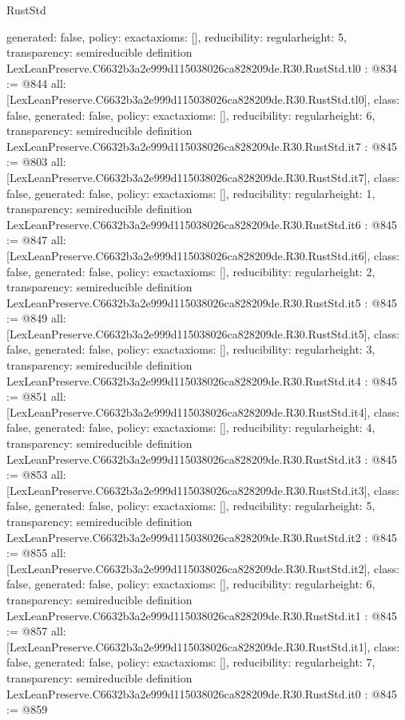 \begin{lexlean}{RustStd}
\begin{coremodule}
{  generated: false,
  policy: exact{axioms: []},
  reducibility: regular{height: 5},
  transparency: semireducible
}
definition LexLeanPreserve.C6632b3a2e999d115038026ca828209de.R30.RustStd.tl0 : @834 := @844 {
  all: [LexLeanPreserve.C6632b3a2e999d115038026ca828209de.R30.RustStd.tl0],
  class: false,
  generated: false,
  policy: exact{axioms: []},
  reducibility: regular{height: 6},
  transparency: semireducible
}
definition LexLeanPreserve.C6632b3a2e999d115038026ca828209de.R30.RustStd.it7 : @845 := @803 {
  all: [LexLeanPreserve.C6632b3a2e999d115038026ca828209de.R30.RustStd.it7],
  class: false,
  generated: false,
  policy: exact{axioms: []},
  reducibility: regular{height: 1},
  transparency: semireducible
}
definition LexLeanPreserve.C6632b3a2e999d115038026ca828209de.R30.RustStd.it6 : @845 := @847 {
  all: [LexLeanPreserve.C6632b3a2e999d115038026ca828209de.R30.RustStd.it6],
  class: false,
  generated: false,
  policy: exact{axioms: []},
  reducibility: regular{height: 2},
  transparency: semireducible
}
definition LexLeanPreserve.C6632b3a2e999d115038026ca828209de.R30.RustStd.it5 : @845 := @849 {
  all: [LexLeanPreserve.C6632b3a2e999d115038026ca828209de.R30.RustStd.it5],
  class: false,
  generated: false,
  policy: exact{axioms: []},
  reducibility: regular{height: 3},
  transparency: semireducible
}
definition LexLeanPreserve.C6632b3a2e999d115038026ca828209de.R30.RustStd.it4 : @845 := @851 {
  all: [LexLeanPreserve.C6632b3a2e999d115038026ca828209de.R30.RustStd.it4],
  class: false,
  generated: false,
  policy: exact{axioms: []},
  reducibility: regular{height: 4},
  transparency: semireducible
}
definition LexLeanPreserve.C6632b3a2e999d115038026ca828209de.R30.RustStd.it3 : @845 := @853 {
  all: [LexLeanPreserve.C6632b3a2e999d115038026ca828209de.R30.RustStd.it3],
  class: false,
  generated: false,
  policy: exact{axioms: []},
  reducibility: regular{height: 5},
  transparency: semireducible
}
definition LexLeanPreserve.C6632b3a2e999d115038026ca828209de.R30.RustStd.it2 : @845 := @855 {
  all: [LexLeanPreserve.C6632b3a2e999d115038026ca828209de.R30.RustStd.it2],
  class: false,
  generated: false,
  policy: exact{axioms: []},
  reducibility: regular{height: 6},
  transparency: semireducible
}
definition LexLeanPreserve.C6632b3a2e999d115038026ca828209de.R30.RustStd.it1 : @845 := @857 {
  all: [LexLeanPreserve.C6632b3a2e999d115038026ca828209de.R30.RustStd.it1],
  class: false,
  generated: false,
  policy: exact{axioms: []},
  reducibility: regular{height: 7},
  transparency: semireducible
}
definition LexLeanPreserve.C6632b3a2e999d115038026ca828209de.R30.RustStd.it0 : @845 := @859 {
}
\end{coremodule}
\end{lexlean}
